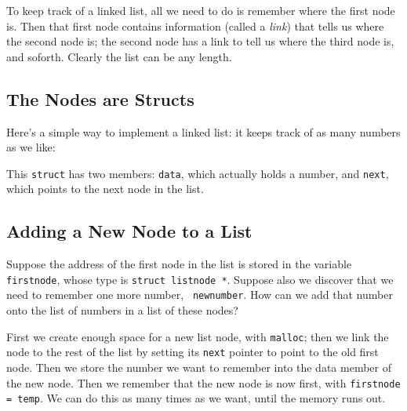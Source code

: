 To keep track of a linked list, all we need to do is remember where the
first node is.  Then that first node contains information (called a {\em
link}\/) that tells us where the second node is; the second node has a
link to tell us where the third node is, and soforth. Clearly the list
can be any length.

\subsection{The Nodes are Structs}

Here's a simple way to implement a linked list: it keeps track of as
many numbers as we like:

\begin{flushleft}
\verb% struct listnode {% \\*
\verb%   int data; % \\*
\verb%   struct listnode *next; % \\*
\verb%} ; % 
\end{flushleft}

This {\tt struct} has two members:  {\tt data}, which actually holds a
number, and {\tt next}, which points to the next node in the list.  

\subsection{Adding a New Node to a List}

Suppose the address of the first node in the list is stored in the
variable {\tt firstnode}, whose type is {\tt struct listnode *}.
Suppose also we discover that we need to remember one more number, {\tt
newnumber}.  How can we add that number onto the list of numbers in a
list of these nodes?

\begin{flushleft}
\verb% struct listnode *temp;% \\* 
\verb% % \\* 
\verb% temp = malloc(sizeof(struct listnode));% \\* 
\verb% % \\* 
\verb% (*temp).next = firstnode;% \\* 
\verb% (*temp).data = newnumber;% \\* 
\verb% firstnode = temp;% \\* 
\end{flushleft}

First we create enough space for a new list node, with {\tt malloc};
then we link the node to the rest of the list by setting its {\tt next}
pointer to point to the old first node.  Then we store the number we
want to remember into the data member of the new node.  Then we remember
that the new node is now first, with {\tt firstnode = temp}.  We can do
this as many times as we want, until the memory runs out.

